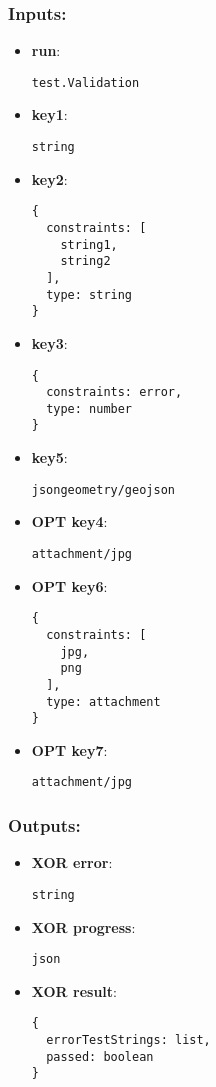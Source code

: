 \subsubsection*{Inputs:}
\begin{itemize}
    \item \textbf{run}: 
\begin{lstlisting}
test.Validation
\end{lstlisting}
    \item \textbf{key1}: 
\begin{lstlisting}
string
\end{lstlisting}
    \item \textbf{key2}: 
\begin{lstlisting}
{
  constraints: [
    string1, 
    string2
  ], 
  type: string
}
\end{lstlisting}
    \item \textbf{key3}: 
\begin{lstlisting}
{
  constraints: error, 
  type: number
}
\end{lstlisting}
    \item \textbf{key5}: 
\begin{lstlisting}
jsongeometry/geojson
\end{lstlisting}
    \item \textbf{OPT key4}: 
\begin{lstlisting}
attachment/jpg
\end{lstlisting}
    \item \textbf{OPT key6}: 
\begin{lstlisting}
{
  constraints: [
    jpg, 
    png
  ], 
  type: attachment
}
\end{lstlisting}
    \item \textbf{OPT key7}: 
\begin{lstlisting}
attachment/jpg
\end{lstlisting}
  \end{itemize}

\subsubsection*{Outputs:}
\begin{itemize}
    \item \textbf{XOR error}: 
\begin{lstlisting}
string
\end{lstlisting}
    \item \textbf{XOR progress}: 
\begin{lstlisting}
json
\end{lstlisting}
    \item \textbf{XOR result}: 
\begin{lstlisting}
{
  errorTestStrings: list, 
  passed: boolean
}
\end{lstlisting}
  \end{itemize}

